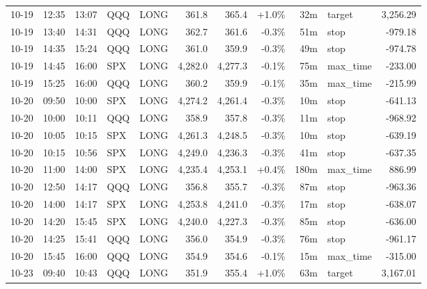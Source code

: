 \documentclass[11pt,a4paper,twoside]{article}
\begin{document}
\begin{center}
\begin{longtable}{>{\color{txtmain}}l l l l l r r r r >{\color{txtmain}}l r}
10-19 & 12:35 & 13:07 & QQQ & LONG & 361.8 & 365.4 & \textcolor{wingreen}{+1.0\%} & 32m & target & \textcolor{wingreen}{3,256.29} \\
10-19 & 13:40 & 14:31 & QQQ & LONG & 362.7 & 361.6 & \textcolor{lossred}{-0.3\%} & 51m & stop & \textcolor{lossred}{-979.18} \\
10-19 & 14:35 & 15:24 & QQQ & LONG & 361.0 & 359.9 & \textcolor{lossred}{-0.3\%} & 49m & stop & \textcolor{lossred}{-974.78} \\
10-19 & 14:45 & 16:00 & SPX & LONG & 4,282.0 & 4,277.3 & \textcolor{lossred}{-0.1\%} & 75m & max\_time & \textcolor{lossred}{-233.00} \\
10-19 & 15:25 & 16:00 & QQQ & LONG & 360.2 & 359.9 & \textcolor{lossred}{-0.1\%} & 35m & max\_time & \textcolor{lossred}{-215.99} \\
10-20 & 09:50 & 10:00 & SPX & LONG & 4,274.2 & 4,261.4 & \textcolor{lossred}{-0.3\%} & 10m & stop & \textcolor{lossred}{-641.13} \\
10-20 & 10:00 & 10:11 & QQQ & LONG & 358.9 & 357.8 & \textcolor{lossred}{-0.3\%} & 11m & stop & \textcolor{lossred}{-968.92} \\
10-20 & 10:05 & 10:15 & SPX & LONG & 4,261.3 & 4,248.5 & \textcolor{lossred}{-0.3\%} & 10m & stop & \textcolor{lossred}{-639.19} \\
10-20 & 10:15 & 10:56 & SPX & LONG & 4,249.0 & 4,236.3 & \textcolor{lossred}{-0.3\%} & 41m & stop & \textcolor{lossred}{-637.35} \\
10-20 & 11:00 & 14:00 & SPX & LONG & 4,235.4 & 4,253.1 & \textcolor{wingreen}{+0.4\%} & 180m & max\_time & \textcolor{wingreen}{886.99} \\
10-20 & 12:50 & 14:17 & QQQ & LONG & 356.8 & 355.7 & \textcolor{lossred}{-0.3\%} & 87m & stop & \textcolor{lossred}{-963.36} \\
10-20 & 14:00 & 14:17 & SPX & LONG & 4,253.8 & 4,241.0 & \textcolor{lossred}{-0.3\%} & 17m & stop & \textcolor{lossred}{-638.07} \\
10-20 & 14:20 & 15:45 & SPX & LONG & 4,240.0 & 4,227.3 & \textcolor{lossred}{-0.3\%} & 85m & stop & \textcolor{lossred}{-636.00} \\
10-20 & 14:25 & 15:41 & QQQ & LONG & 356.0 & 354.9 & \textcolor{lossred}{-0.3\%} & 76m & stop & \textcolor{lossred}{-961.17} \\
10-20 & 15:45 & 16:00 & QQQ & LONG & 354.9 & 354.6 & \textcolor{lossred}{-0.1\%} & 15m & max\_time & \textcolor{lossred}{-315.00} \\
10-23 & 09:40 & 10:43 & QQQ & LONG & 351.9 & 355.4 & \textcolor{wingreen}{+1.0\%} & 63m & target & \textcolor{wingreen}{3,167.01} \\

\end{longtable}
\end{center}
\end{document}
